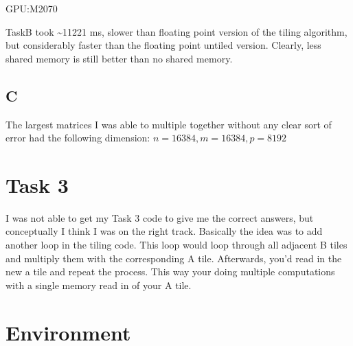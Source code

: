 \documentclass[11pt]{article}
\begin{document}
GPU:M2070

TaskB took \textasciitilde{}11221 ms, slower than floating point version of the tiling algorithm, but considerably faster than the floating point untiled version. Clearly, less shared memory is still better than no shared memory.

\subsection{C}
\label{sec:org12806bf}
The largest matrices I was able to multiple together without any clear sort of error had the following dimension: \(n = 16384, m = 16384, p = 8192\)

\section{Task 3}
\label{sec:orgc8db272}
I was not able to get my Task 3 code to give me the correct answers, but conceptually I think I was on the right track. Basically the idea was to add another loop in the tiling code. This loop would loop through all adjacent B tiles and multiply them with the corresponding A tile. Afterwards, you'd read in the new a tile and repeat the process. This way your doing multiple computations with a single memory read in of your A tile. 

\section{Environment}
\label{sec:org747303a}
\end{document}
